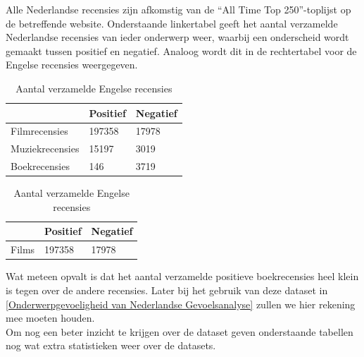 Alle Nederlandse recensies zijn afkomstig van de ``All Time Top 250''-toplijst op de betreffende website. Onderstaande linkertabel geeft het aantal verzamelde Nederlandse recensies van ieder onderwerp weer, waarbij een onderscheid wordt gemaakt tussen positief en negatief. Analoog wordt dit in de rechtertabel voor de Engelse recensies weergegeven.\\

\begin{table}[h]
\centering
\setlength\tabcolsep{2pt}
\begin{minipage}[t]{0.48\textwidth}
\centering
\begin{tabular}{l|l|l|}
\cline{2-3}
                                      & Positief & Negatief \\ \hline
\multicolumn{1}{|l|}{Filmrecensies}   & 197358   & 17978    \\ \hline
\multicolumn{1}{|l|}{Muziekrecensies} & 15197    & 3019     \\ \hline
\multicolumn{1}{|l|}{Boekrecensies}   & 146      & 3719     \\ \hline
\end{tabular}
\caption{Aantal verzamelde Nederlandse recensies} 
\end{minipage}%
\hfill
\begin{minipage}[t]{0.48\textwidth}
\centering
\begin{tabular}{l|l|l|}
\cline{2-3}
                            & Positief & Negatief \\ \hline
\multicolumn{1}{|l|}{Films} & 197358   & 17978    \\ \hline
\end{tabular}
\caption{Aantal verzamelde Engelse recensies}
\end{minipage}
\end{table}

Wat meteen opvalt is dat het aantal verzamelde positieve boekrecensies heel klein is tegen over de andere recensies. Later bij het gebruik van deze dataset in \ref{Onderwerpgevoeligheid van Nederlandse Gevoelsanalyse} zullen we hier rekening mee moeten houden.\\

Om nog een beter inzicht te krijgen over de dataset geven onderstaande tabellen nog wat extra statistieken weer over de datasets.\\

